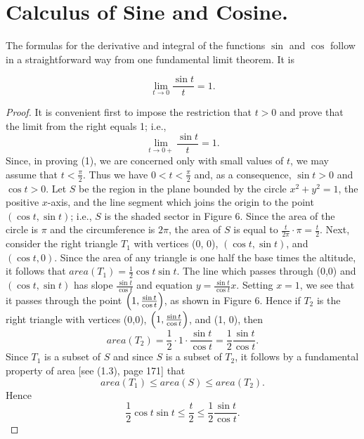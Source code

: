 \section{Calculus of Sine and Cosine.}
 The formulas for the derivative and integral of the functions $\sin$
and $\cos$ follow in a straightforward way from one fundamental limit theorem. It is

\begin{theorem} %
$$
\lim_{t \rightarrow 0} \frac{\sin t}{t} = 1.  
$$
\end{theorem}



\begin{proof}
It is convenient first to impose the restriction that $t > 0$ and prove that the limit from
the right equals 1; i.e.,
\begin{equation}
\lim_{t \rightarrow 0+} \frac{\sin t}{t} = 1.  
\label{eq6.2.1}
\end{equation}
Since, in proving (1), we are concerned only with small values of $t$, we may assume 
that $t < \frac{\pi}{2}$.  Thus we have $0 < t < \frac{\pi}{2}$ and, as a consequence,
$\sin t > 0$ and $\cos t > 0$. Let $S$ be the region in the plane bounded by the circle $x^2 + y^2 = 1$, 
the positive $x$-axis, and the line segment which joins the origin to the point $(\cos t, \sin t)$; i.e., 
$S$ is the shaded sector in Figure 6. Since  
the area of the circle is $\pi$ and the circumference is $2\pi$, the area of $S$ is equal to 
$\frac{t}{2\pi} \cdot \pi = \frac{t}{2}$.  Next, consider the right triangle $T_{1}$ with vertices (0, 0),
$(\cos t, \sin t)$, and $(\cos t, 0)$. Since the area of any triangle is one half the base times the
altitude, it follows that $area(T_{1}) = \frac{1}{2} \cos t \sin t$. The line which passes through (0,0) 
and $(\cos t, \sin t)$ has slope $\frac{\sin t}{\cos t}$ and equation $y =\frac{\sin t}{\cos t}x$. 
Setting $x = 1$, we see that it passes through the point
$\Bigl(1,\frac{\sin t}{\cos t} \Bigr)$, as shown in Figure 6. Hence if $T_{2}$ is the right triangle with  
vertices (0,0), $\Bigl(1, \frac{\sin t}{\cos t} \Bigr)$, and (1, 0), then
$$
area(T_{2}) = \frac{1}{2} \cdot 1 \cdot \frac{\sin t}{\cos t} = \frac{1}{2} \frac{\sin t}{\cos t}.
$$
Since $T_{1}$ is a subset of $S$ and since $S$ is a subset of $T_{2}$, it follows by a fundamental property of area [see (1.3), page 171] that
$$
area(T_{1}) \leq area(S) \leq area(T_{2}).
$$
Hence
$$
\frac{1}{2} \cos t \sin t \leq \frac{t}{2} \leq \frac{1}{2} \frac{\sin t}{\cos t} .
$$
\end{proof}
